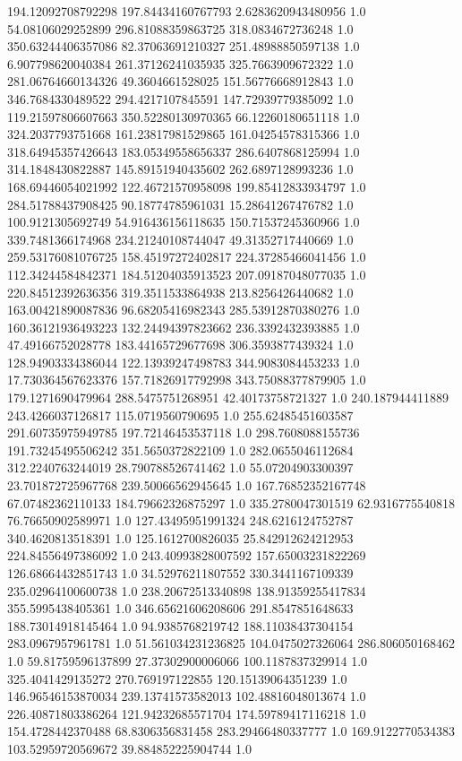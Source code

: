 194.12092708792298	197.84434160767793	2.6283620943480956	1.0
54.08106029252899	296.81088359863725	318.0834672736248	1.0
350.63244406357086	82.37063691210327	251.48988850597138	1.0
6.907798620040384	261.37126241035935	325.7663909672322	1.0
281.06764660134326	49.3604661528025	151.56776668912843	1.0
346.7684330489522	294.4217107845591	147.72939779385092	1.0
119.21597806607663	350.52280130970365	66.12260180651118	1.0
324.2037793751668	161.23817981529865	161.04254578315366	1.0
318.64945357426643	183.05349558656337	286.6407868125994	1.0
314.1848430822887	145.89151940435602	262.6897128993236	1.0
168.69446054021992	122.46721570958098	199.85412833934797	1.0
284.51788437908425	90.18774785961031	15.28641267476782	1.0
100.9121305692749	54.916436156118635	150.71537245360966	1.0
339.7481366174968	234.21240108744047	49.31352717440669	1.0
259.53176081076725	158.45197272402817	224.37285466041456	1.0
112.34244584842371	184.51204035913523	207.09187048077035	1.0
220.84512392636356	319.3511533864938	213.8256426440682	1.0
163.00421890087836	96.68205416982343	285.53912870380276	1.0
160.36121936493223	132.24494397823662	236.3392432393885	1.0
47.49166752028778	183.44165729677698	306.3593877439324	1.0
128.94903334386044	122.13939247498783	344.9083084453233	1.0
17.730364567623376	157.71826917792998	343.75088377879905	1.0
179.1271690479964	288.5475751268951	42.40173758721327	1.0
240.187944411889	243.4266037126817	115.0719560790695	1.0
255.62485451603587	291.60735975949785	197.72146453537118	1.0
298.7608088155736	191.73245495506242	351.5650372822109	1.0
282.0655046112684	312.2240763244019	28.790788526741462	1.0
55.07204903300397	23.701872725967768	239.50066562945645	1.0
167.76852352167748	67.07482362110133	184.79662326875297	1.0
335.2780047301519	62.9316775540818	76.76650902589971	1.0
127.43495951991324	248.6216124752787	340.4620813518391	1.0
125.1612700826035	25.842912624212953	224.84556497386092	1.0
243.40993828007592	157.65003231822269	126.68664432851743	1.0
34.52976211807552	330.3441167109339	235.02964100600738	1.0
238.20672513340898	138.91359255417834	355.5995438405361	1.0
346.65621606208606	291.8547851648633	188.73014918145464	1.0
94.9385768219742	188.11038437304154	283.0967957961781	1.0
51.561034231236825	104.0475027326064	286.806050168462	1.0
59.81759596137899	27.37302900006066	100.1187837329914	1.0
325.4041429135272	270.769197122855	120.15139064351239	1.0
146.96546153870034	239.13741573582013	102.48816048013674	1.0
226.40871803386264	121.94232685571704	174.59789417116218	1.0
154.4728442370488	68.8306356831458	283.29466480337777	1.0
169.9122770534383	103.52959720569672	39.884852225904744	1.0
